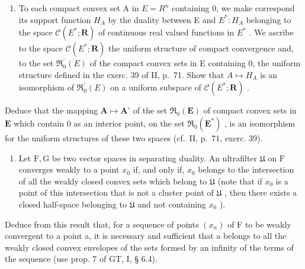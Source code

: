 \begin{enumerate}
\def\labelenumi{\arabic{enumi})}
\setcounter{enumi}{9}
\tightlist
\item
  To each compact convex set A in \(E = R^{n}\) containing 0, we make correspond its support function \(H_{A}\) by the duality between E and \(E^{*} : H_{A}\) belonging to the space \(\mathcal{C}(E^{*}; \mathbf{R})\) of continuous real valued functions in \(E^{*}\) . We ascribe to the space \(\mathcal{C}(E^{*}; \mathbf{R})\) the uniform structure of compact convergence and, to the set \(\Re_{0}^{\prime}(E)\) of the compact convex sets in E containing 0, the uniform structure defined in the exerc. 39 of II, p.~71. Show that \(A \mapsto H_{A}\) is an isomorphism of \(\Re_{0}^{\prime}(E)\) on a uniform subspace of \(\mathcal{C}(E^{*}; \mathbf{R})\) .
\end{enumerate}

Deduce that the mapping \(\mathbf{A} \mapsto \mathbf{A}^{\circ}\) of the set \(\Re_0(\mathbf{E})\) of compact convex sets in \(\mathbf{E}\) which contain 0 as an interior point, on the set \(\Re_0(\mathbf{E}^*)\) , is an isomorphism for the uniform structures of these two spaces (cf.~II, p.~71, exerc. 39).

\begin{enumerate}
\def\labelenumi{\arabic{enumi})}
\setcounter{enumi}{10}
\tightlist
\item
  Let \(\mathrm{F}, \mathrm{G}\) be two vector spaces in separating duality. An ultrafilter \(\mathfrak{U}\) on \(\mathrm{F}\) converges weakly to a point \(x_0\) if, and only if, \(x_0\) belongs to the intersection of all the weakly closed convex sets which belong to \(\mathfrak{U}\) (note that if \(x_0\) is a point of this intersection that is not a cluster point of \(\mathfrak{U}\) , then there exists a closed half-space belonging to \(\mathfrak{U}\) and not containing \(x_0\) ).
\end{enumerate}

Deduce from this result that, for a sequence of points \((x_{n})\) of F to be weakly convergent to a point a, it is necessary and sufficient that a belongs to all the weakly closed convex envelopes of the sets formed by an infinity of the terms of the sequence (use prop. 7 of GT, I, § 6.4).

